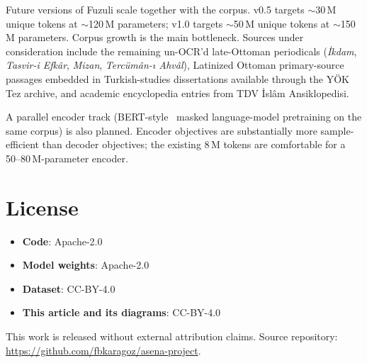 \documentclass[11pt,a4paper]{article}
\begin{document}
Future versions of Fuzuli scale together with the corpus. v0.5 targets
$\sim$30\,M unique tokens at $\sim$120\,M parameters; v1.0 targets
$\sim$50\,M unique tokens at $\sim$150\,M parameters. Corpus growth is the
main bottleneck. Sources under consideration include the remaining un-OCR'd
late-Ottoman periodicals (\emph{İkdam}, \emph{Tasvir-i Efkâr}, \emph{Mizan},
\emph{Tercümân-ı Ahvâl}), Latinized Ottoman primary-source passages
embedded in Turkish-studies dissertations available through the YÖK Tez
archive, and academic encyclopedia entries from TDV İslâm Ansiklopedisi.

A parallel encoder track (BERT-style~\citep{devlin2019bert} masked
language-model pretraining on the same corpus) is also planned. Encoder
objectives are substantially more sample-efficient than decoder objectives;
the existing 8\,M tokens are comfortable for a 50--80\,M-parameter encoder.

\section*{License}

\begin{itemize}[leftmargin=*,nosep]
  \item \textbf{Code}: Apache-2.0
  \item \textbf{Model weights}: Apache-2.0
  \item \textbf{Dataset}: CC-BY-4.0
  \item \textbf{This article and its diagrams}: CC-BY-4.0
\end{itemize}

This work is released without external attribution claims. Source repository:
\url{https://github.com/fbkaragoz/asena-project}.
\end{document}
